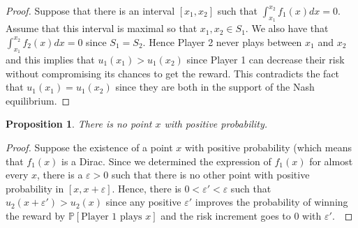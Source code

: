 \documentclass[preprint,12pt,authoryear,doubleblind]{elsarticle}
\newtheorem{proposition}[theorem]{Proposition}
\theoremstyle{definition}
\begin{document}
\begin{proof}
    
 Suppose that there is an interval $[x_1, x_2]$ such that $\int_{x_1}^{x_2} f_1(x) dx =0$. Assume that this interval is maximal so that $x_1, x_2 \in S_1$. We also have that $\int_{x_1}^{x_2} f_2(x) dx = 0$ since $S_1 = S_2$. Hence Player 2 never plays between $x_1$ and $x_2$ and this implies that $u_1(x_1) > u_1(x_2)$ since Player 1 can decrease their risk without compromising its chances to get the reward. This contradicts the fact that $u_1(x_1) = u_1(x_2)$ since they are both in the support of the Nash equilibrium.
\end{proof}
\begin{proposition}
There is no point $x$ with positive probability.
\end{proposition}
\begin{proof}
 Suppose the existence of a point $x$ with positive probability (which means that $f_1(x)$ is a Dirac. Since we determined the expression of $f_1(x)$ for almost every $x$, there is a $\varepsilon > 0$ such that there is no other point with positive probability in $[x, x+\varepsilon]$. Hence, there is $0 < \varepsilon' < \varepsilon$ such that $u_2(x + \varepsilon') > u_2(x)$ since any positive $\varepsilon'$ improves the probability of winning the reward by $\mathbb{P}[\text{Player 1 plays } x]$ and the risk increment goes to $0$ with $\varepsilon'$.\
\end{proof}

\nashcor*
\end{document}
